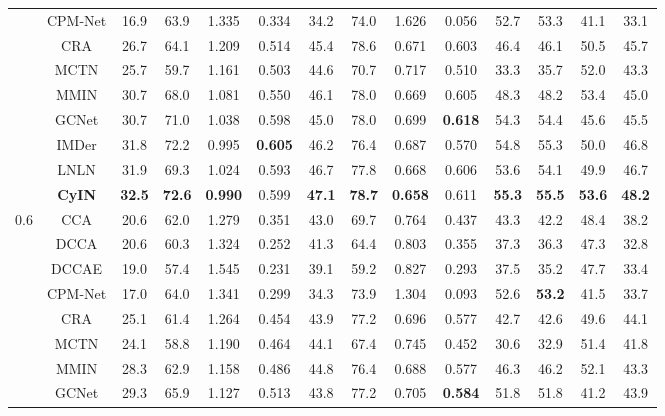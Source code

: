 \documentclass{article}
\begin{document}
\begin{table}[htbp]
{\begin{tabular}{cccccccccccccc}
        ~ & CPM-Net & 16.9  & 63.9  & 1.335  & 0.334  & 34.2  & 74.0  & 1.626  & 0.056  & 52.7  & 53.3  & 41.1  & 33.1  \\ 
        ~ & CRA & 26.7  & 64.1  & 1.209  & 0.514  & 45.4  & 78.6  & 0.671  & 0.603  & 46.4  & 46.1  & 50.5  & 45.7  \\ 
        ~ & MCTN & 25.7  & 59.7  & 1.161  & 0.503  & 44.6  & 70.7  & 0.717  & 0.510  & 33.3  & 35.7  & 52.0  & 43.3  \\ 
        ~ & MMIN & 30.7  & 68.0  & 1.081  & 0.550  & 46.1  & 78.0  & 0.669  & 0.605  & 48.3  & 48.2  & 53.4  & 45.0 \\ 
        ~ & GCNet & 30.7  & 71.0  & 1.038  & 0.598  & 45.0  & 78.0  & 0.699  & \textbf{0.618}  & 54.3  & 54.4  & 45.6  & 45.5  \\ 
        ~ & IMDer & 31.8  & 72.2  & 0.995  & \textbf{0.605}  & 46.2  & 76.4  & 0.687  & 0.570  & 54.8  & 55.3  & 50.0  & 46.8 \\ 
        ~ & LNLN & 31.9  & 69.3  & 1.024  & 0.593  & 46.7  & 77.8  & 0.668  & 0.606  & 53.6  & 54.1  & 49.9  & 46.7  \\ 
    & \textbf{CyIN} & \textbf{32.5} & \textbf{72.6} & \textbf{0.990} & 0.599 & \textbf{47.1} & \textbf{78.7} & \textbf{0.658} & 0.611 & \textbf{55.3} & \textbf{55.5} & \textbf{53.6} & \textbf{48.2} \\ 
    \midrule[0.5pt]
    \multirow{11}{*}{$0.6$} ~ & CCA & 20.6  & 62.0  & 1.279  & 0.351  & 43.0  & 69.7  & 0.764  & 0.437  & 43.3  & 42.2  & 48.4  & 38.2  \\ 
        ~ & DCCA & 20.6  & 60.3  & 1.324  & 0.252  & 41.3  & 64.4  & 0.803  & 0.355  & 37.3  & 36.3  & 47.3  & 32.8  \\ 
        ~ & DCCAE & 19.0  & 57.4  & 1.545  & 0.231  & 39.1  & 59.2  & 0.827  & 0.293  & 37.5  & 35.2  & 47.7  & 33.4  \\ 
        ~ & CPM-Net & 17.0  & 64.0  & 1.341  & 0.299  & 34.3  & 73.9  & 1.304  & 0.093  & 52.6  & \textbf{53.2}  & 41.5  & 33.7  \\ 
        ~ & CRA & 25.1  & 61.4  & 1.264  & 0.454  & 43.9  & 77.2  & 0.696  & 0.577  & 42.7  & 42.6  & 49.6  & 44.1  \\ 
        ~ & MCTN & 24.1  & 58.8  & 1.190  & 0.464  & 44.1  & 67.4  & 0.745  & 0.452  & 30.6  & 32.9  & 51.4  & 41.8  \\ 
        ~ & MMIN & 28.3  & 62.9  & 1.158  & 0.486  & 44.8  & 76.4  & 0.688  & 0.577  & 46.3  & 46.2  & 52.1  & 43.3 \\ 
        ~ & GCNet & 29.3  & 65.9  & 1.127  & 0.513  & 43.8  & 77.2  & 0.705  & \textbf{0.584}  & 51.8  & 51.8  & 41.2  & 43.9  \\ 

\end{tabular}}
\end{table}
\end{document}
